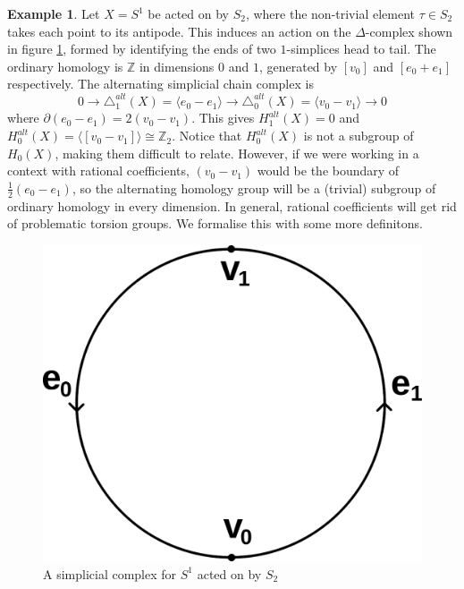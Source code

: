 \documentclass[11pt,a4paper,twoside]{article}
\theoremstyle{plain}
\theoremstyle{definition}
\theoremstyle{definition}
\theoremstyle{definition}
\theoremstyle{definition}
\newtheorem{example}[thm]{Example}
\theoremstyle{definition}
\begin{document}
\begin{example}
\label{Ex:AntipodalActionOnS1}
Let $X=S^1$ be acted on by $S_2$, where the non-trivial element $\tau\in S_2$ takes each point to its antipode. This induces an action on the $\Delta$-complex shown in figure \ref{Fig:AntipodalActionOnS1}, formed by identifying the ends of two $1$-simplices head to tail. The ordinary homology is $\mathbb{Z}$ in dimensions $0$ and $1$, generated by $[v_0]$ and $[e_0+e_1]$ respectively. The alternating simplicial chain complex is 
$$0\longrightarrow \triangle_1^{alt}(X)=\langle e_0-e_1\rangle \longrightarrow \triangle_0^{alt}(X)=\langle v_0-v_1\rangle\longrightarrow0$$
where $\partial(e_0-e_1)=2(v_0-v_1)$. This gives $H_1^{alt}(X)=0$ and $H_0^{alt}(X)=\langle [v_0-v_1]\rangle\cong\mathbb{Z}_2$. Notice that $H_0^{alt}(X)$ is not a subgroup of $H_0(X)$, making them difficult to relate. However, if we were working in a context with rational coefficients, $(v_0-v_1)$ would be the boundary of $\frac12(e_0-e_1)$, so the alternating homology group will be a (trivial) subgroup of ordinary homology in every dimension. In general, rational coefficients will get rid of problematic torsion groups. We formalise this with some more definitons.
\begin{figure}[h]
    \centering
    \includegraphics[scale=0.15]{Images/RationalCoeffMotivation.png}
    \caption{A simplicial complex for $S^1$ acted on by $S_2$}
    \label{Fig:AntipodalActionOnS1}
\end{figure}
\end{example}
\end{document}
